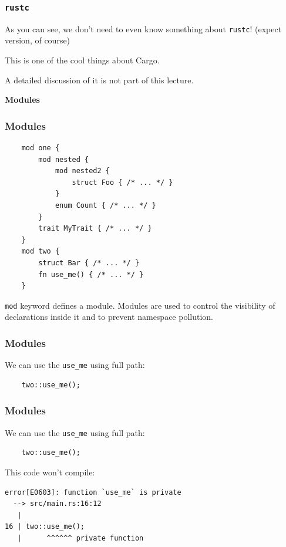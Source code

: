 \documentclass[aspectratio=1610,t]{beamer}
\begin{document}

\begin{frame}[fragile]
\frametitle{\texttt{rustc}}
As you can see, we don't need to even know something about \texttt{rustc}! (expect version, of course)

This is one of the cool things about Cargo.

A detailed discussion of it is not part of this lecture.
\end{frame}


\begin{frame}[c]
\centering\Huge\textbf{Modules}
\end{frame}


\begin{frame}[fragile]
\frametitle{Modules}
\begin{verbatim}
    mod one {
        mod nested {
            mod nested2 {
                struct Foo { /* ... */ }
            }
            enum Count { /* ... */ }
        }
        trait MyTrait { /* ... */ }
    }
    mod two {
        struct Bar { /* ... */ }
        fn use_me() { /* ... */ }
    }
\end{verbatim}

\texttt{mod} keyword defines a module. Modules are used to control the visibility of declarations inside it and to prevent namespace pollution.
\end{frame}


\begin{frame}[fragile]
\frametitle{Modules}
We can use the \texttt{use\_me} using full path:

\begin{verbatim}
    two::use_me();
\end{verbatim}
\end{frame}


\begin{frame}[fragile]
\frametitle{Modules}
We can use the \texttt{use\_me} using full path:

\begin{verbatim}
    two::use_me();
\end{verbatim}

This code won't compile:

\begin{verbatim}
error[E0603]: function `use_me` is private
  --> src/main.rs:16:12
   |
16 | two::use_me();
   |      ^^^^^^ private function
\end{verbatim}
\end{frame}
\end{document}
